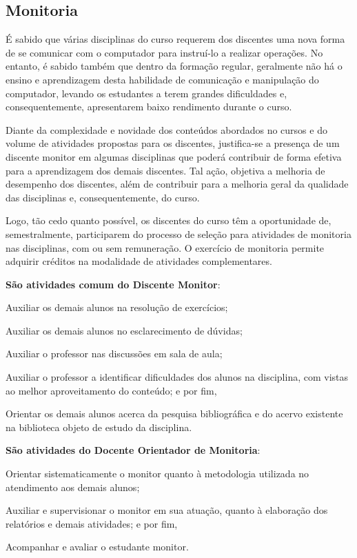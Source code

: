 \documentclass[
	12pt,				%
	openright,			%
	twoside,			%
	a4paper,			%
	chapter=TITLE,		%
	english,			%
	french,				%
	spanish,			%
	brazil,				%
	]{abntex2}
\begin{document}
\subsection{Monitoria}

É sabido que várias disciplinas do curso  requerem dos discentes  uma nova forma de se comunicar com o computador para instruí-lo a realizar operações. No entanto, é sabido também que dentro da formação regular, geralmente não há o ensino e aprendizagem desta  habilidade de comunicação e manipulação do computador,  levando os estudantes a terem grandes dificuldades e, consequentemente, apresentarem baixo rendimento durante o curso.

Diante da complexidade e novidade dos conte\'udos abordados no cursos e do  volume de atividades propostas para os discentes, justifica-se a presen\c{c}a de um discente monitor em algumas disciplinas que poder\'a contribuir de forma efetiva para a aprendizagem dos demais discentes. Tal a\c{c}\~ao, objetiva a melhoria de  desempenho dos discentes, al\'em de contribuir para a melhoria geral da qualidade das disciplinas e, consequentemente, do curso. 

Logo, tão cedo quanto possível,  os discentes do curso têm a oportunidade de, semestralmente, participarem do processo de seleção para atividades de monitoria nas disciplinas, com ou sem remuneração. O exercício de monitoria permite adquirir créditos na modalidade de atividades complementares.


\textbf{São atividades comum do Discente Monitor}:
\begin{alineas}
\item Auxiliar os demais alunos na resolução de exercícios;
\item Auxiliar os demais alunos no esclarecimento de dúvidas;
\item Auxiliar o professor nas discussões em sala de aula;
\item Auxiliar o professor a identificar dificuldades dos alunos na disciplina, com vistas ao melhor aproveitamento do conteúdo; e por fim,
\item Orientar os demais alunos acerca da pesquisa bibliográfica e do acervo existente na biblioteca objeto de estudo da disciplina.

\end{alineas}


\textbf{São atividades do Docente Orientador de Monitoria}:
\begin{alineas}
\item Orientar sistematicamente o monitor quanto à metodologia utilizada no atendimento aos demais alunos;
\item Auxiliar e supervisionar o monitor em sua atuação, quanto à elaboração dos relatórios e demais atividades; e por fim,
\item Acompanhar e avaliar o estudante monitor.
\end{alineas}
\end{document}
